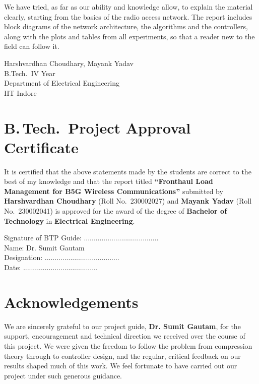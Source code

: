 \documentclass[12pt,a4paper,oneside]{report}
\newcommand{\btptitle}{Fronthaul Load Management for B5G Wireless Communications}
\newcommand{\studentA}{Harshvardhan Choudhary}
\newcommand{\rollA}{230002027}
\newcommand{\studentB}{Mayank Yadav}
\newcommand{\rollB}{230002041}
\newcommand{\guidename}{Dr. Sumit Gautam}
\newcommand{\discipline}{Electrical Engineering}
\theoremstyle{definition}
\begin{document}
We have tried, as far as our ability and knowledge allow, to explain the material clearly, starting from the basics of the radio access network. The report includes block diagrams of the network architecture, the algorithms and the controllers, along with the plots and tables from all experiments, so that a reader new to the field can follow it.

\vspace{2cm}
\noindent
\studentA, \studentB\\
B.Tech.\ IV Year\\
Department of \discipline\\
IIT Indore

\chapter*{B.\,Tech.\ Project Approval Certificate}
It is certified that the above statements made by the students are correct to the best of my knowledge and that the report titled \textbf{``\btptitle''} submitted by \textbf{\studentA} (Roll No.\ \rollA) and \textbf{\studentB} (Roll No.\ \rollB) is approved for the award of the degree of \textbf{Bachelor of Technology} in \textbf{\discipline}.

\vspace{2cm}
\begin{flushright}
Signature of BTP Guide: \hspace{0.5cm} ......................................\\[1cm]
Name: \hspace{0.5cm} \guidename\\[1cm]
Designation: \hspace{0.5cm} ......................................\\[1cm]
Date: \hspace{0.5cm} ......................................
\end{flushright}

\chapter*{Acknowledgements}
We are sincerely grateful to our project guide, \textbf{\guidename}, for the support, encouragement and technical direction we received over the course of this project. We were given the freedom to follow the problem from compression theory through to controller design, and the regular, critical feedback on our results shaped much of this work. We feel fortunate to have carried out our project under such generous guidance.
\end{document}
